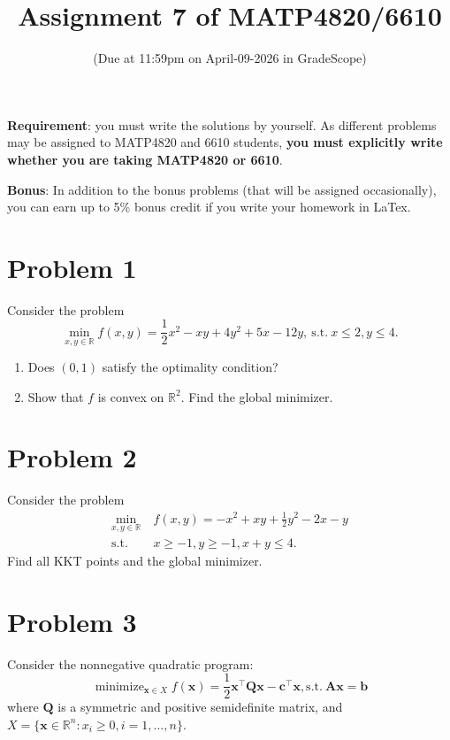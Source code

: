 \documentclass[12pt]{article}
\title{Assignment 7 of MATP4820/6610 }
\author{(Due at 11:59pm on April-09-2026 in GradeScope)}
\date{}
\newcommand{\vb}{{\mathbf{b}}}
\newcommand{\vc}{{\mathbf{c}}}
\newcommand{\vx}{{\mathbf{x}}}
\newcommand{\vA}{{\mathbf{A}}}
\newcommand{\vQ}{{\mathbf{Q}}}
\newcommand{\RR}{\mathbb{R}}
\newcommand{\st}{{\text{s.t.}}} %
\DeclareMathOperator*{\Min}{minimize}
\begin{document}
\maketitle

\noindent\textbf{Requirement}: you must write the solutions by yourself. As different problems may be assigned to MATP4820 and 6610 students, \textbf{you must explicitly write whether you are taking MATP4820 or 6610}. 

\vspace{0.2cm}

\noindent\textbf{Bonus}: In addition to the bonus problems (that will be assigned occasionally), you can earn up to 5\% bonus credit if you write your homework in LaTex. 

\section*{Problem 1}
Consider the problem
$$\min_{x,y\in\RR} f(x,y) = \frac{1}{2}x^2-xy+4y^2+5x-12y,\ \st\ x\le 2, y\le 4.$$

\begin{enumerate}
\item Does $(0,1)$ satisfy the optimality condition?
\item Show that $f$ is convex on $\RR^2$. Find the global minimizer.
\end{enumerate}

\newpage

\section*{Problem 2}
Consider the problem
\begin{align*}
\min_{x,y\in\RR} &~f(x,y) = -x^2+xy+\frac{1}{2}y^2-2x-y\\
\st &~ x\ge -1, y \ge -1, x+y\le 4.
\end{align*}
Find all KKT points and the global minimizer.

\newpage


\section*{Problem 3}
Consider the nonnegative quadratic program:
\begin{equation}\label{eq:nqp}
\Min_{\vx\in X} f(\vx) = \frac{1}{2}\vx^\top \vQ\vx - \vc^\top\vx, \st\ \vA\vx = \vb
\end{equation}
where $\vQ$ is a symmetric and positive semidefinite matrix, and $X=\{\vx\in\RR^n: x_i\ge0, i=1,\ldots, n\}$.
\end{document}
